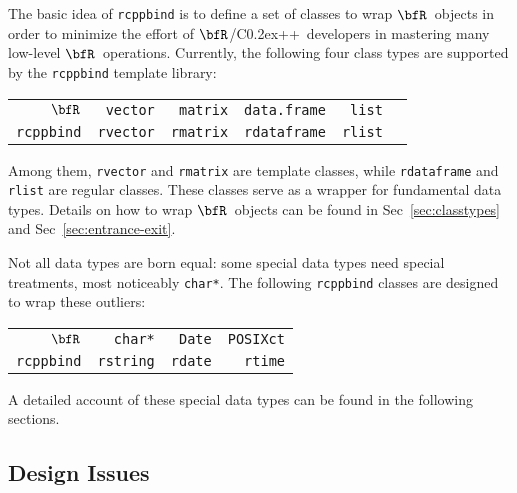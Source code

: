 \documentclass{article}
\def\C++{C{\raise 0.2ex\hbox{++}}}
\newcommand{\R}{$\bfR$}
\begin{document}
The basic idea of \texttt{rcppbind} is to define a set of
classes to wrap \R\ objects in order to minimize the
effort of \R/\C++\ developers in mastering many low-level \R\
operations. Currently, the following four class types are
supported by the \texttt{rcppbind} template library:
\begin{center}
  \begin{tabular}{r|rrrrr} \hline\hline
    \R                & \texttt{vector} & \texttt{matrix} & \texttt{data.frame} & \texttt{list} \\
    \texttt{rcppbind} & \texttt{rvector} & \texttt{rmatrix} & \texttt{rdataframe} & \texttt{rlist} \\
    \hline\hline
  \end{tabular}
\end{center}
Among them, \texttt{rvector} and \texttt{rmatrix} are
template classes, while \texttt{rdataframe} and
\texttt{rlist} are regular classes. These classes serve as a
wrapper for fundamental data types. Details on how to wrap
\R\ objects can be found in Sec~\ref{sec:classtypes} and
Sec~\ref{sec:entrance-exit}.

Not all data types are born equal: some special data types
need special treatments, most noticeably \texttt{char*}. The
following \texttt{rcppbind} classes are designed to wrap
these outliers: 
\begin{center}
  \begin{tabular}{r|rrr} \hline\hline
    \R                & \texttt{char*} & \texttt{Date} & \texttt{POSIXct} \\
    \texttt{rcppbind} & \texttt{rstring} & \texttt{rdate} & \texttt{rtime} \\
    \hline\hline
  \end{tabular}
\end{center}
A detailed account of these special data types can be found
in the following sections.

\subsection{Design Issues}
\end{document}
